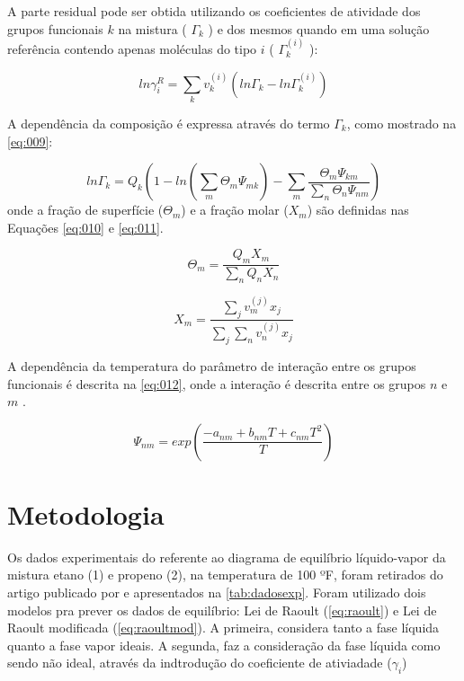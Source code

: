 A parte residual pode ser obtida utilizando os coeficientes de atividade dos
grupos funcionais $k$  na mistura ( $\Gamma_k$ ) e dos mesmos quando em uma
solução referência contendo apenas moléculas do tipo $i$ ( $\Gamma_k^{(i)}$ ):


\begin{equation}\label{eq:008}
ln\gamma_i^R = \displaystyle\sum_kv^{(i)}_k\left ( ln\Gamma_k -
ln\Gamma_k^{(i)} \right )
\end{equation}

A dependência da composição é expressa através do termo $\Gamma_k$, como
mostrado na \autoref{eq:009}:

\begin{equation}\label{eq:009}
ln\Gamma_k = Q_k\left ( 1 - ln\left ( \displaystyle\sum_m\Theta_m\Psi_{mk}
\right ) -
\displaystyle\sum_m\frac{\Theta_m\Psi_{km}}{\displaystyle\sum_n\Theta_n\Psi_{nm}}
\right )
\end{equation}
onde a fração de superfície ($\Theta_m$) e a fração molar ($X_m$) são definidas
nas Equações \ref{eq:010} e \ref{eq:011}.

\begin{equation}\label{eq:010}
\Theta_m = \frac{Q_mX_m}{\displaystyle\sum_nQ_nX_n}
\end{equation}

\begin{equation}\label{eq:011}
X_m =
\frac{\displaystyle\sum_jv^{(j)}_mx_j}{\displaystyle\sum_j\sum_nv_n^{(j)}x_j}
\end{equation}

A dependência da temperatura do parâmetro de interação entre os grupos
funcionais é descrita na \autoref{eq:012}, onde a interação é descrita entre os
grupos $n$ e $m$ .

\begin{equation}\label{eq:012}
\Psi_{nm} = exp \left ( \frac{-a_{nm} + b_{nm}T + c_{nm}T^2}{T} \right)
\end{equation}


\section{Metodologia}

Os dados experimentais do referente ao diagrama de equilíbrio líquido-vapor da
mistura etano (1) e propeno (2), na temperatura de 100 ºF, foram retirados do
artigo publicado por  e apresentados na \autoref{tab:dadosexp}. Foram
utilizado dois modelos pra prever os dados de equilíbrio: Lei de Raoult (\autoref{eq:raoult}) e Lei de
Raoult modificada (\autoref{eq:raoultmod}). A primeira, considera tanto a fase
líquida quanto a fase vapor ideais. A segunda, faz a consideração da fase
líquida como sendo não ideal, através da indtrodução do coeficiente de
ativiadade ($\gamma_i$)

